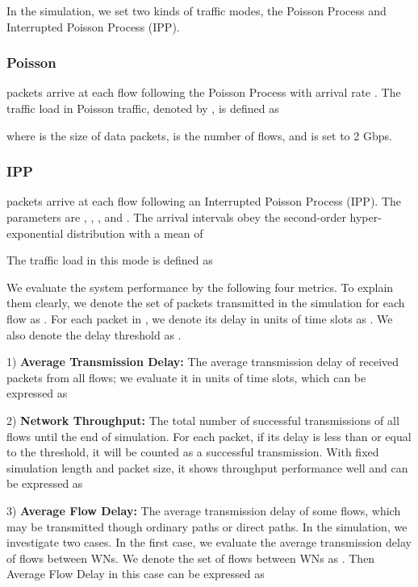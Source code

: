 \documentclass[journal]{IEEEtran}
\begin{document}
In the simulation, we set two kinds of traffic modes, the Poisson Process and Interrupted Poisson
Process (IPP).

\subsubsection {\textbf{Poisson}} packets arrive at each flow following the Poisson Process with arrival
rate . The traffic load in Poisson traffic, denoted by , is defined as
 
where  is the size of data packets,  is the number of flows, and  is set to 2 Gbps.

\subsubsection {\textbf{IPP}} packets arrive at each flow following an Interrupted Poisson
Process (IPP). The parameters are , , , and . The
arrival intervals obey the second-order hyper-exponential distribution with a mean of

The traffic load  in this mode is defined as
 


We evaluate the system performance by the following four metrics. To explain them clearly, we
denote the set of packets transmitted in the simulation for each flow  as . For each packet
 in , we denote its delay in units of time slots as . We also denote the delay
threshold as .


1) \textbf{Average Transmission Delay:} The average transmission delay of received packets from all
flows; we evaluate it in units of time slots, which can be expressed as





2) \textbf{Network Throughput:} The total number of successful transmissions of all flows until the
end of simulation. For each packet, if its delay is less than or equal to the threshold, it will be
counted as a successful transmission. With fixed simulation length and packet size, it shows
throughput performance well and can be expressed as





3) \textbf{Average Flow Delay:} The average transmission delay of some flows, which may be transmitted though ordinary paths or direct paths. In the simulation, we
investigate two cases. In the first case, we evaluate the average transmission delay of flows
between WNs. We denote the set of flows between WNs as . Then Average Flow Delay in
this case can be expressed as
\end{document}
